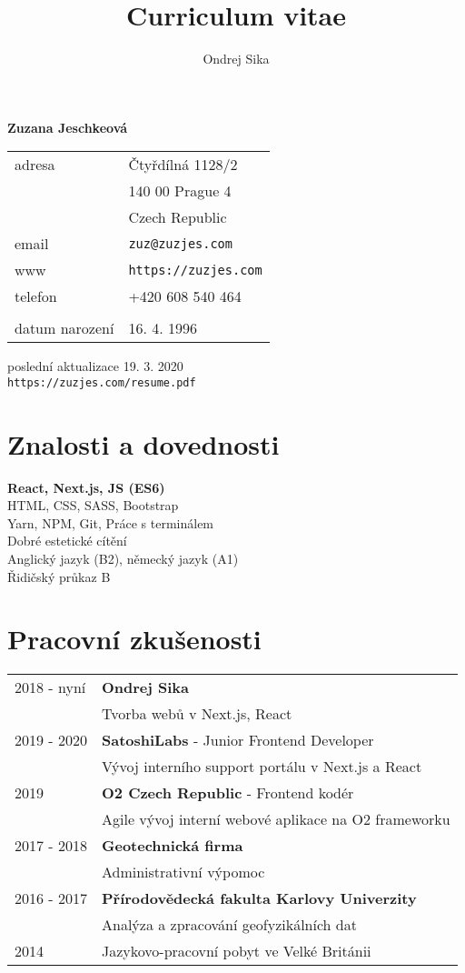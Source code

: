 \documentclass[12pt,a4paper]{article}
\title{Curriculum vitae}
\author{Ondrej Sika}
\begin{document}
\begin{center}
{\LARGE \bf Zuzana Jeschkeová}\\
\vspace*{0.2cm}
\begin{tabular}{R{5cm}L{5cm}}
adresa & Čtyřdílná 1128/2\\
 & 140 00 Prague 4\\
 & Czech Republic\\
email & \texttt{zuz@zuzjes.com}\\
www & \texttt{https://zuzjes.com}\\
telefon & +420 608 540 464\\
\\
datum narození & 16. 4. 1996\\
\end{tabular}

\vspace*{0.3cm}
{\hfill poslední aktualizace 19. 3. 2020}\\
{\hfill \texttt{https://zuzjes.com/resume.pdf}}
\end{center}

\section*{Znalosti a dovednosti}
{\bf React, Next.js, JS (ES6)}\\
HTML, CSS, SASS, Bootstrap\\
Yarn, NPM, Git, Práce s terminálem\\
Dobré estetické cítění\\
Anglický jazyk (B2), německý jazyk (A1)\\
Řidičský průkaz B\\

\section*{Pracovní zkušenosti}
\begin{tabular}{@{}p{2cm}l}
2018 - nyní & {\bf Ondrej Sika}\\
 & Tvorba webů v Next.js, React\\
2019 - 2020 & {\bf SatoshiLabs} - Junior Frontend Developer\\
  & Vývoj interního support portálu v Next.js a React\\
2019 & {\bf O2 Czech Republic} - Frontend kodér\\
 & Agile vývoj interní webové aplikace na O2 frameworku\\
2017 - 2018 & {\bf Geotechnická firma}\\
 & Administrativní výpomoc\\
2016 - 2017 & {\bf Přírodovědecká fakulta Karlovy Univerzity}\\
 & Analýza a zpracování geofyzikálních dat\\
2014 & Jazykovo-pracovní pobyt ve Velké Británii\\
\end{tabular}\\
\end{document}

